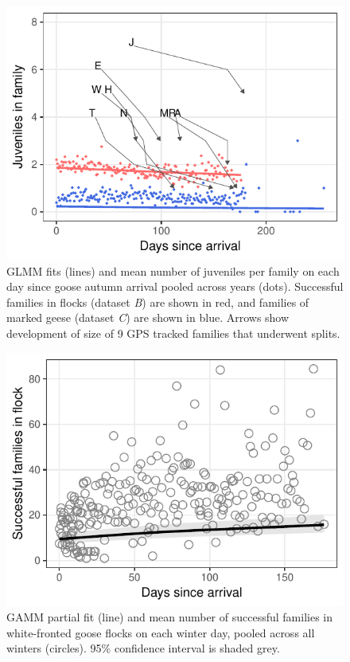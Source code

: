\documentclass[10pt,twocolumn]{paper}
\begin{document}
\begin{figure}
\includegraphics[width = 1\linewidth]{fam_time.pdf}
\caption{{\small GLMM fits (lines) and mean number of juveniles per family on each day since goose autumn arrival pooled across years (dots). Successful families in flocks (dataset \emph{B}) are shown in red, and families of marked geese (dataset \emph{C}) are shown in blue. Arrows show development of size of 9 GPS tracked families that underwent splits.}}
\end{figure}

\begin{figure}
\includegraphics[width = 1\linewidth]{nfams_time.pdf}
\caption{{\small GAMM partial fit (line) and mean number of successful families in
white-fronted goose flocks on each winter day, pooled across all winters
(circles). 95\% confidence interval is shaded grey.}}
\end{figure}
\end{document}
